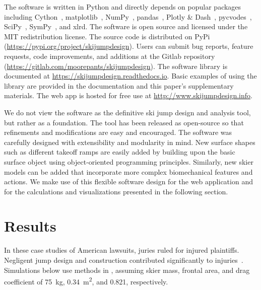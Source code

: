 \documentclass[smallextended]{svjour3}       %
\begin{document}
The software is written in Python and directly depends on popular packages
including Cython~\cite{Behnel2011}, matplotlib~\cite{Hunter2007},
NumPy~\cite{Oliphant2006}, pandas~\cite{McKinney2020}, Plotly \&
Dash~\cite{Plotly2015}, pycvodes~\cite{Dahlgren2018},
SciPy~\cite{Virtanen2020}, SymPy~\cite{Meurer2017}, and xlrd. The software is
open source and licensed under the MIT redistribution license. The source code
is distributed on PyPi (\url{https://pypi.org/project/skijumpdesign}). Users can
submit bug reports, feature requests, code improvements, and additions at the
Gitlab repository (\url{https://gitlab.com/moorepants/skijumpdesign}). The
software library is documented at \url{https://skijumpdesign.readthedocs.io}.
Basic examples of using the library are provided in the documentation and this
paper's supplementary materials. The web app is hosted for free use at
\url{http://www.skijumpdesign.info}.

We do not view the software as the definitive ski jump design and analysis tool, but rather as a foundation. The tool has been released as open-source so that refinements and modifications are easy and encouraged. The software was carefully designed with extensibility and modularity in mind. New surface shapes such as different takeoff ramps are easily added by building upon the basic surface object using object-oriented programming principles. Similarly, new skier models can be added that incorporate more complex biomechanical features and actions. We make use of this flexible software design for the web application and for the calculations and visualizations presented in the following section.

\section{Results}
\label{sec:case}
%
In these case studies of American lawsuits, juries ruled for injured
plaintiffs. Negligent jump design and construction contributed significantly to
injuries~\cite{SuperiorCourtSanFranciscoCounty2002,KingCountySuperiorCourt2008}.
Simulations below use methods in \cite{Levy2015}, assuming skier mass, frontal
area, and drag coefficient of 75~\si{\kg}, 0.34~\si{\meter\squared}, and 0.821,
respectively.
\end{document}
